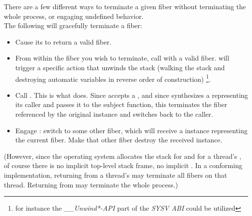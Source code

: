 
There are a few different ways to terminate a given fiber without
terminating the whole process, or engaging undefined behavior.\\

%
The following will gracefully terminate a fiber:

\begin{itemize}
    \item Cause its \entryfn to return a valid fiber.
    \item From within the fiber you wish to terminate, call \unwindfib with a
          valid fiber. \unwindfib will trigger a specific action that unwinds
          the stack (walking the stack and destroying automatic variables in
          reverse order of construction)
          \footnote{for instance the \emph{\_\_Unwind*-API} part of the
          \emph{SYSV ABI} could be utilized}.
    \item Call . This is what \dtor
          does. Since \unwindfib accepts a \fiber, and since \resumewith
          synthesizes a \fiber representing its caller and passes it to the
          subject function, this terminates the fiber referenced by the
          original \fiber instance and switches back to the caller.
    \item Engage \dtor: switch to some other fiber, which will
          receive a \fiber instance representing the current fiber. Make that
          other fiber destroy the received \fiber instance.
\end{itemize}

(However, since the operating system allocates the stack for \main and for a
thread's \entryfn, of course there is no implicit top-level stack frame, no
implicit . In a conforming implementation,
returning from a thread's \entryfn\xspace may terminate all fibers on that
thread. Returning from \main may terminate the whole process.)

